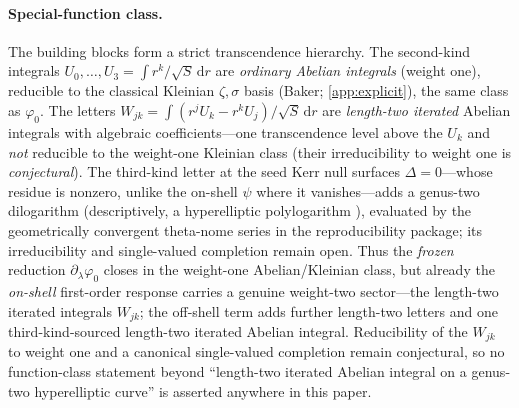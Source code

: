 \documentclass[12pt]{iopart}
\theoremstyle{plain}
\theoremstyle{definition}
\theoremstyle{remark}
\newcommand{\dd}{\mathrm{d}}
\begin{document}
\paragraph{Special-function class.} The building blocks form a strict transcendence
hierarchy. The second-kind integrals $U_0,\dots,U_3=\int r^k/\sqrt S\,\dd r$ are
\emph{ordinary Abelian integrals} (weight one), reducible to the classical Kleinian
$\zeta,\sigma$ basis (Baker; \ref{app:explicit}), the same class as $\varphi_0$. The
letters $W_{jk}=\int(r^jU_k-r^kU_j)/\sqrt S\,\dd r$ are \emph{length-two iterated} Abelian
integrals with algebraic coefficients---one transcendence level above the $U_k$ and
\emph{not} reducible to the weight-one Kleinian class (their irreducibility to weight one
is \emph{conjectural}). The third-kind letter at the seed Kerr null surfaces
$\Delta=0$---whose residue is nonzero, unlike the on-shell $\psi$ where it
vanishes---adds a genus-two dilogarithm (descriptively, a hyperelliptic polylogarithm
\cite{BauneEtal2024,DHokerHiddingSchlotterer2025}), evaluated by the geometrically
convergent theta-nome series in the reproducibility package; its irreducibility and
single-valued completion remain open. Thus the \emph{frozen} reduction
$\partial_\lambda\varphi_0$ closes in the weight-one Abelian/Kleinian class, but already
the \emph{on-shell} first-order response carries a genuine weight-two sector---the
length-two iterated integrals $W_{jk}$; the off-shell term adds further length-two letters
and one third-kind-sourced length-two iterated Abelian integral. Reducibility of the
$W_{jk}$ to weight one and a canonical single-valued completion remain conjectural, so no
function-class statement beyond ``length-two iterated Abelian integral on a genus-two
hyperelliptic curve'' is asserted anywhere in this paper.
\end{document}
